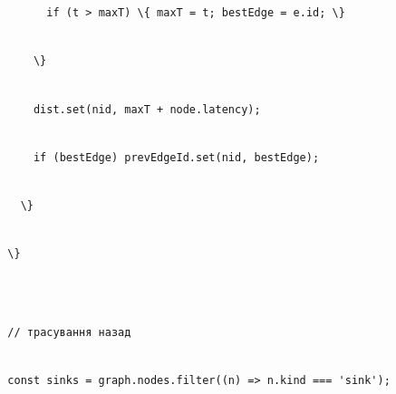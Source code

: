 \documentclass[
]{article}
\newcommand{\passthrough}[1]{#1}
\begin{document}
\passthrough{\lstinline!        !}\passthrough{\lstinline!if!}\passthrough{\lstinline! !}\passthrough{\lstinline!(t!}\passthrough{\lstinline! !}\passthrough{\lstinline!>!}\passthrough{\lstinline! !}\passthrough{\lstinline!maxT!}\passthrough{\lstinline!)!}\passthrough{\lstinline! !}\passthrough{\lstinline!\{!}\passthrough{\lstinline! !}\passthrough{\lstinline!maxT!}\passthrough{\lstinline! !}\passthrough{\lstinline!=!}\passthrough{\lstinline! !}\passthrough{\lstinline!t;!}\passthrough{\lstinline! !}\passthrough{\lstinline!bestEdge!}\passthrough{\lstinline! !}\passthrough{\lstinline!=!}\passthrough{\lstinline! !}\passthrough{\lstinline!e.id;!}\passthrough{\lstinline! !}\passthrough{\lstinline!\}!}\strut \\
\passthrough{\lstinline!      !}\passthrough{\lstinline!\}!}\strut \\
\passthrough{\lstinline!      !}\passthrough{\lstinline!dist.set!}\passthrough{\lstinline!(!}\passthrough{\lstinline!nid!}\passthrough{\lstinline!,!}\passthrough{\lstinline! !}\passthrough{\lstinline!maxT!}\passthrough{\lstinline! !}\passthrough{\lstinline!+!}\passthrough{\lstinline! !}\passthrough{\lstinline!node.latency!}\passthrough{\lstinline!);!}\strut \\
\passthrough{\lstinline!      !}\passthrough{\lstinline!if!}\passthrough{\lstinline! !}\passthrough{\lstinline!(!}\passthrough{\lstinline!bestEdge!}\passthrough{\lstinline!)!}\passthrough{\lstinline! !}\passthrough{\lstinline!prevEdgeId.set!}\passthrough{\lstinline!(!}\passthrough{\lstinline!nid!}\passthrough{\lstinline!,!}\passthrough{\lstinline! !}\passthrough{\lstinline!bestEdge!}\passthrough{\lstinline!);!}\strut \\
\passthrough{\lstinline!    !}\passthrough{\lstinline!\}!}\strut \\
\passthrough{\lstinline!  !}\passthrough{\lstinline!\}!}\strut \\
\strut \\
\passthrough{\lstinline!  !}\passthrough{\lstinline!//!}\passthrough{\lstinline! !}\passthrough{\lstinline!трасування!}\passthrough{\lstinline! !}\passthrough{\lstinline!назад!}\strut \\
\passthrough{\lstinline!  !}\passthrough{\lstinline!const!}\passthrough{\lstinline! !}\passthrough{\lstinline!sinks!}\passthrough{\lstinline! !}\passthrough{\lstinline!=!}\passthrough{\lstinline! !}\passthrough{\lstinline!graph.nodes.filter!}\passthrough{\lstinline!((n)!}\passthrough{\lstinline! !}\passthrough{\lstinline!=>!}\passthrough{\lstinline! !}\passthrough{\lstinline!n.kind!}\passthrough{\lstinline! !}\passthrough{\lstinline!===!}\passthrough{\lstinline! !}\passthrough{\lstinline!'sink');!}\strut \\
\end{document}
